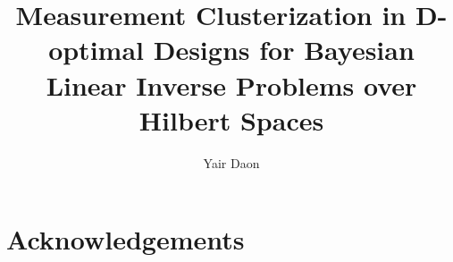 \documentclass{amsart}
\title{Measurement Clusterization in D-optimal Designs for Bayesian
  Linear Inverse Problems over Hilbert Spaces
}
\author[1]{Yair Daon}
\begin{document}
\maketitle

\begin{abstract}
  
\end{abstract}










\section{Acknowledgements}





\end{document}
